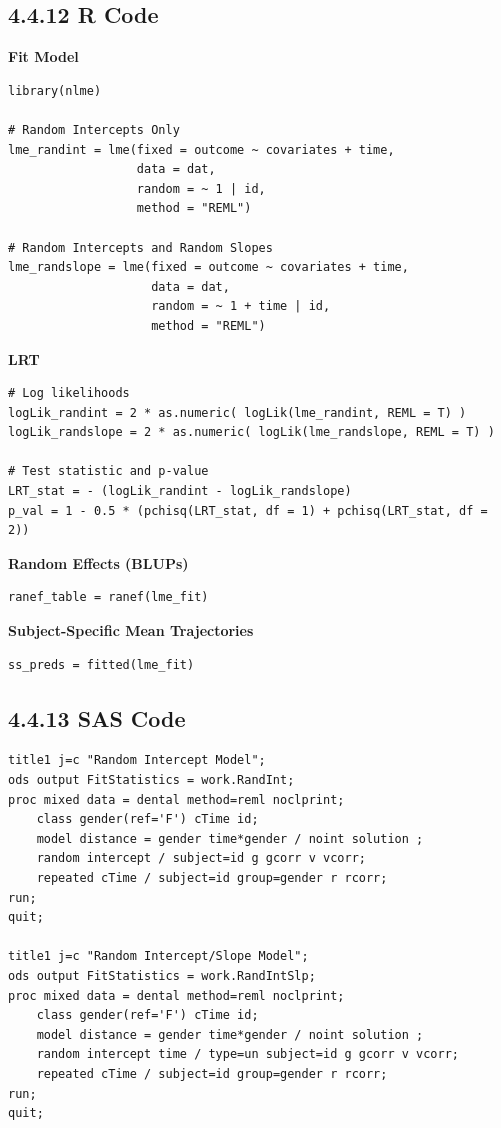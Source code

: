 \documentclass[11pt]{article}
\begin{document}
\subsection*{4.4.12 R Code}

\textbf{Fit Model}
\begin{lstlisting}[style=Rstyle]
library(nlme)

# Random Intercepts Only
lme_randint = lme(fixed = outcome ~ covariates + time,
                  data = dat,
                  random = ~ 1 | id,
                  method = "REML")

# Random Intercepts and Random Slopes
lme_randslope = lme(fixed = outcome ~ covariates + time,
                    data = dat,
                    random = ~ 1 + time | id,
                    method = "REML")
\end{lstlisting}

\textbf{LRT}
\begin{lstlisting}[style=Rstyle]
# Log likelihoods
logLik_randint = 2 * as.numeric( logLik(lme_randint, REML = T) )
logLik_randslope = 2 * as.numeric( logLik(lme_randslope, REML = T) )

# Test statistic and p-value
LRT_stat = - (logLik_randint - logLik_randslope)
p_val = 1 - 0.5 * (pchisq(LRT_stat, df = 1) + pchisq(LRT_stat, df = 2))
\end{lstlisting}

\textbf{Random Effects (BLUPs)}
\begin{lstlisting}[style=Rstyle]
ranef_table = ranef(lme_fit)
\end{lstlisting}

\textbf{Subject-Specific Mean Trajectories}
\begin{lstlisting}[style=Rstyle]
ss_preds = fitted(lme_fit)
\end{lstlisting}

\subsection*{4.4.13 SAS Code}

\begin{lstlisting}[style=SASstyle]
title1 j=c "Random Intercept Model";
ods output FitStatistics = work.RandInt;
proc mixed data = dental method=reml noclprint;
	class gender(ref='F') cTime id;
	model distance = gender time*gender / noint solution ;
	random intercept / subject=id g gcorr v vcorr;
	repeated cTime / subject=id group=gender r rcorr;
run;
quit;

title1 j=c "Random Intercept/Slope Model";
ods output FitStatistics = work.RandIntSlp;
proc mixed data = dental method=reml noclprint;
	class gender(ref='F') cTime id;
	model distance = gender time*gender / noint solution ;
	random intercept time / type=un subject=id g gcorr v vcorr;
	repeated cTime / subject=id group=gender r rcorr;
run;
quit;
\end{lstlisting}
\end{document}
